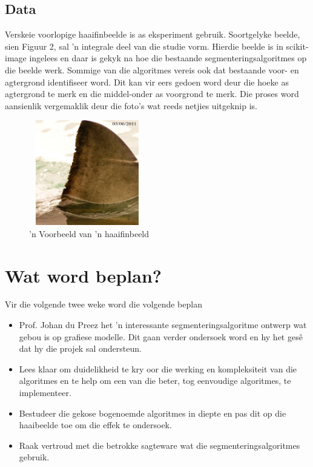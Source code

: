 \documentclass[a4paper,10pt]{article}
\begin{document}
\subsection{Data}
Verskeie voorlopige haaifinbeelde is as eksperiment gebruik. Soortgelyke beelde, sien Figuur 2, sal 'n integrale deel van die studie vorm.  
Hierdie beelde is in scikit-image ingelees en daar is gekyk na 
hoe die bestaande segmenteringsalgoritmes op die beelde werk.  Sommige van die algoritmes vereis ook dat bestaande voor- en agtergrond identifiseer word.  Dit kan vir eers gedoen word deur
die hoeke as agtergrond te merk en die middel-onder as voorgrond te merk.  Die proses word aansienlik vergemaklik deur die foto's wat reeds netjies 
uitgeknip is.
\begin{figure}[H]
 \centering
 \includegraphics[width=2in, height=1.8in]{haai2}
 \caption{'n Voorbeeld van 'n haaifinbeeld}
 \label{fin}
\end{figure}

\section{Wat word beplan?}
Vir die volgende twee weke word die volgende beplan
\begin{itemize}
 \item Prof. Johan du Preez het 'n interessante segmenteringsalgoritme ontwerp wat gebou is op grafiese modelle.
 Dit gaan verder ondersoek word en hy het ges\^{e} dat hy die projek sal ondersteun.
 \item Lees \cite{art} klaar om duidelikheid te kry oor die werking en kompleksiteit van die algoritmes en te help om een van die beter, tog 
 eenvoudige algoritmes, te implementeer.
 \item Bestudeer die gekose bogenoemde algoritmes in diepte en pas dit op die haaibeelde toe om die effek te ondersoek.
 \item Raak vertroud met die betrokke sagteware wat die segmenteringsalgoritmes gebruik.
\end{itemize}

\newpage

\end{document}
